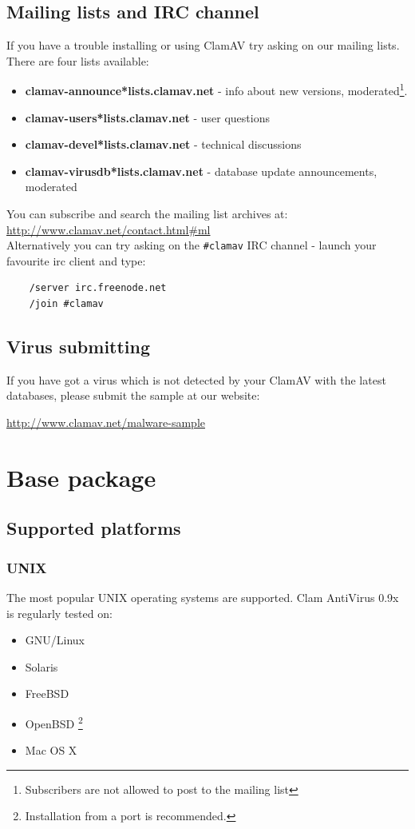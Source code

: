 \documentclass[a4paper,titlepage,12pt]{article}
\begin{document}
    \subsection{Mailing lists and IRC channel}
    If you have a trouble installing or using ClamAV try asking on our mailing
    lists. There are four lists available:
    \begin{itemize}
    \item \textbf{clamav-announce*lists.clamav.net} - info about new versions,
    moderated\footnote{Subscribers are not allowed to post to the mailing
    list}.
    \item \textbf{clamav-users*lists.clamav.net} - user questions
    \item \textbf{clamav-devel*lists.clamav.net} - technical discussions
    \item \textbf{clamav-virusdb*lists.clamav.net} - database update announcements, moderated
    \end{itemize}
    \noindent You can subscribe and search the mailing list archives at: 
    \url{http://www.clamav.net/contact.html#ml}\\
    Alternatively you can try asking on the \verb+#clamav+ IRC channel - launch
    your favourite irc client and type:
    \begin{verbatim}
	/server irc.freenode.net
	/join #clamav
    \end{verbatim}

    \subsection{Virus submitting}
    If you have got a virus which is not detected by your ClamAV with the latest
    databases, please submit the sample at our website:
    \begin{center}
	\url{http://www.clamav.net/malware-sample}
    \end{center}

    \section{Base package}

    \subsection{Supported platforms}
	\subsubsection{UNIX}
	The most popular UNIX operating systems are supported. Clam AntiVirus 0.9x is
	regularly tested on:
	\begin{itemize}
	    \item{GNU/Linux}
	    \item{Solaris}
	    \item{FreeBSD}
	    \item{OpenBSD} \footnote{Installation from a port is recommended.}
	    \item{Mac OS X}
	\end{itemize}
\end{document}
